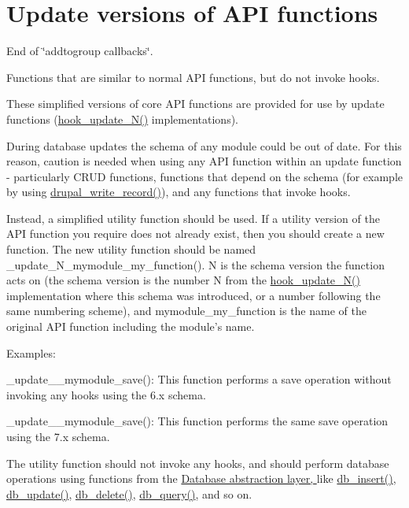 \hypertarget{group__update__api}{
\section{Update versions of API functions}
\label{group__update__api}
}
End of \char`\"{}addtogroup callbacks\char`\"{}.

Functions that are similar to normal API functions, but do not invoke hooks.

These simplified versions of core API functions are provided for use by update functions (\hyperlink{group__hooks_ga908950689e6b85cd0fae3b780d69a41f}{hook\_\-update\_\-N()} implementations).

During database updates the schema of any module could be out of date. For this reason, caution is needed when using any API function within an update function -\/ particularly CRUD functions, functions that depend on the schema (for example by using \hyperlink{group__schemaapi_ga96f707de751a962bf21b6cb0cb4f2ae6}{drupal\_\-write\_\-record()}), and any functions that invoke hooks.

Instead, a simplified utility function should be used. If a utility version of the API function you require does not already exist, then you should create a new function. The new utility function should be named \_\-update\_\-N\_\-mymodule\_\-my\_\-function(). N is the schema version the function acts on (the schema version is the number N from the \hyperlink{group__hooks_ga908950689e6b85cd0fae3b780d69a41f}{hook\_\-update\_\-N()} implementation where this schema was introduced, or a number following the same numbering scheme), and mymodule\_\-my\_\-function is the name of the original API function including the module's name.

Examples:
\begin{DoxyItemize}
\item \_\-update\_\_\-mymodule\_\-save(): This function performs a save operation without invoking any hooks using the 6.x schema.
\item \_\-update\_\_\-mymodule\_\-save(): This function performs the same save operation using the 7.x schema.
\end{DoxyItemize}

The utility function should not invoke any hooks, and should perform database operations using functions from the \hyperlink{group__database}{Database abstraction layer, } like \hyperlink{group__database_gaadfbffaf30ff5eb14f1bd88619351345}{db\_\-insert()}, \hyperlink{group__database_ga40967197ee5d6a23a5c5a77e627067fe}{db\_\-update()}, \hyperlink{group__database_ga72f0ccecc0ba181de16c6e3451150f2c}{db\_\-delete()}, \hyperlink{group__database_gafa3b6cb2b2f61479cc63a4150c62da9b}{db\_\-query()}, and so on.

